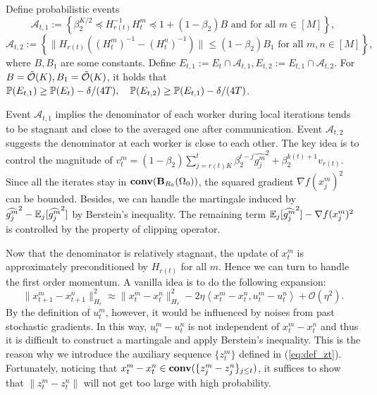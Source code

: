 \documentclass{article} %
\numberwithin{equation}{section}
\renewcommand{\eqref}[1]{(\ref{#1})}
\begin{document}
    \begin{lemma}[Informal]\label{main:lem:contraction_H}
        Define probabilistic events
        \begin{equation}
            \mathcal{A}_{t,1}:=\left\{ \beta_2^{K/2} \preceq H_{r(t)}^{-1}H_t^m \preceq 1+(1-\beta_2)B \text{ and for all }m\in [M] \right\},
        \end{equation}
        \begin{equation}
            \mathcal{A}_{t,2}:=\left\{ \|H_{r(t)}((H_t^m)^{-1}-(H_t^n)^{-1})\|\leq (1-\beta_2)B_1 \text{ for all }m,n\in [M] \right\},
        \end{equation}
        where $B, B_1$ are some constants.
        Define $E_{t,1} := E_t \cap \mathcal{A}_{t,1}, E_{t,2} := E_{t,1} \cap \mathcal{A}_{t,2}$.
        For $B=\Tilde{\mathcal{O}}(K), B_1=\Tilde{\mathcal{O}}(K)$, it holds that $\mathbb{P}(E_{t,1}) \geq \mathbb{P}(E_t) -\delta/(4T),\quad \mathbb{P}(E_{t,2}) \geq \mathbb{P}(E_{t,1}) -\delta/(4T)$.
    \end{lemma} 
    Event $\mathcal{A}_{t,1}$ implies the denominator of each worker during local iterations tends to be stagnant and close to the averaged one after communication.
    Event $\mathcal{A}_{t,2}$ suggests the denominator at each worker is close to each other.
    The key idea is to control the magnitude of $v_t^m=(1-\beta_2)\sum_{j=r(t)K}^{t}\beta_2^{t-j}\widehat{g_j^m}^2 + \beta_2^{k(t)+1} v_{r(t)}$. 
    Since all the iterates stay in $\mbox{\bf conv}(\mbox{\bf B}_{R_0}(\Omega_0))$, the squared gradient $\nabla f(x_j^m)^2$ can be bounded.
    Besides, we can handle the martingale induced by $\widehat{g_j^m}^2-\mathbb{E}_j[\widehat{g_j^m}^2]$ by Berstein's inequality.
    The remaining term $\mathbb{E}_j[\widehat{g_j^m}^2]-\nabla f(x_j^m)^2$ is controlled by the property of clipping operator.

    Now that the denominator is relatively stagnant, the update of $x_t^m$ is approximately preconditioned by $H_{r(t)}$ for all $m$.
    Hence we can turn to handle the first order momentum.
    A vanilla idea is to do the following expansion: 
    \begin{equation}
        \|x_{t+1}^m-x_{t+1}^n\|_{H_r}^2 \approx \|x_t^m-x_t^n\|_{H_r}^2 -2\eta\left\langle x_t^m-x_t^n, u_t^m-u_t^n\right\rangle + \mathcal{O}(\eta^2).
    \end{equation}
    By the definition of $u_t^m$, however, it would be influenced by noises from past stochastic gradients.
    In this way, $u_t^m-u_t^n$ is not independent of $x_t^m-x_t^n$ and thus it is difficult to construct a martingale and apply Berstein's inequality. This is the reason why we introduce the auxiliary sequence $\{z_t^m\}$ defined in \eqref{eq:def_zt}.
    Fortunately, noticing that $x_t^m-x_t^n\in \mbox{\bf conv}(\{z_j^m-z_j^n\}_{j\leq t})$, it suffices to show that $\|z_t^m-z_t^n\|$ will not get too large with high probability. 
   
\end{document}
